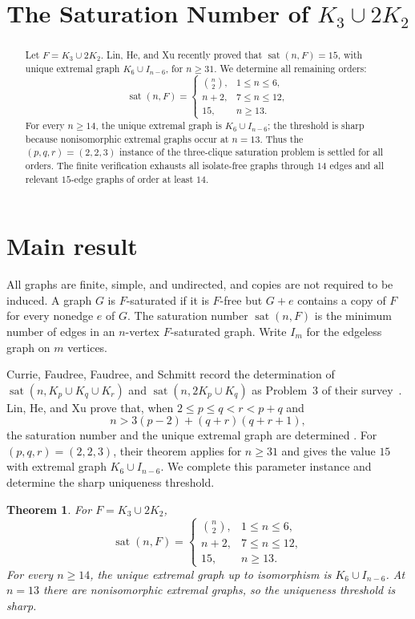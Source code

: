 \documentclass[11pt]{amsart}
\title[The saturation number of $K_3\cup2K_2$]
      {The Saturation Number of $K_3\cup2K_2$}
\date{}
\newtheorem{theorem}{Theorem}
\DeclareMathOperator{\sat}{sat}
\begin{document}
\begin{abstract}
Let $F=K_3\cup2K_2$. Lin, He, and Xu recently proved that
$\sat(n,F)=15$, with unique extremal graph $K_6\cup I_{n-6}$, for
$n\ge31$. We determine all remaining orders:
\[
\sat(n,F)=
\begin{cases}
\binom{n}{2},&1\le n\le6,\\
n+2,&7\le n\le12,\\
15,&n\ge13.
\end{cases}
\]
For every $n\ge14$, the unique extremal graph is $K_6\cup I_{n-6}$;
the threshold is sharp because nonisomorphic extremal graphs occur at $n=13$.
Thus the $(p,q,r)=(2,2,3)$ instance of the three-clique saturation problem is
settled for all orders. The finite verification exhausts all isolate-free graphs
through $14$ edges and all relevant $15$-edge graphs of order at least $14$.
\end{abstract}

\maketitle

\section{Main result}

All graphs are finite, simple, and undirected, and copies are not required to be
induced. A graph $G$ is $F$-saturated if it is $F$-free but $G+e$ contains a copy
of $F$ for every nonedge $e$ of $G$. The saturation number $\sat(n,F)$ is the
minimum number of edges in an $n$-vertex $F$-saturated graph. Write $I_m$ for
the edgeless graph on $m$ vertices.

Currie, Faudree, Faudree, and Schmitt record the determination of
$\sat(n,K_p\cup K_q\cup K_r)$ and $\sat(n,2K_p\cup K_q)$ as
Problem~3 of their survey~\cite{CurrieEtAl}. Lin, He, and Xu prove that, when
$2\le p\le q<r<p+q$ and
\[
n>3(p-2)+(q+r)(q+r+1),
\]
the saturation number and the unique extremal graph are determined
\cite{LinHeXu}. For $(p,q,r)=(2,2,3)$, their theorem applies for $n\ge31$ and
gives the value $15$ with extremal graph $K_6\cup I_{n-6}$. We complete this
parameter instance and determine the sharp uniqueness threshold.

\begin{theorem}\label{thm:main}
For $F=K_3\cup2K_2$,
\[
\sat(n,F)=
\begin{cases}
\binom{n}{2},&1\le n\le6,\\
n+2,&7\le n\le12,\\
15,&n\ge13.
\end{cases}
\]
For every $n\ge14$, the unique extremal graph up to isomorphism is
$K_6\cup I_{n-6}$. At $n=13$ there are nonisomorphic extremal graphs, so the
uniqueness threshold is sharp.
\end{theorem}
\end{document}
